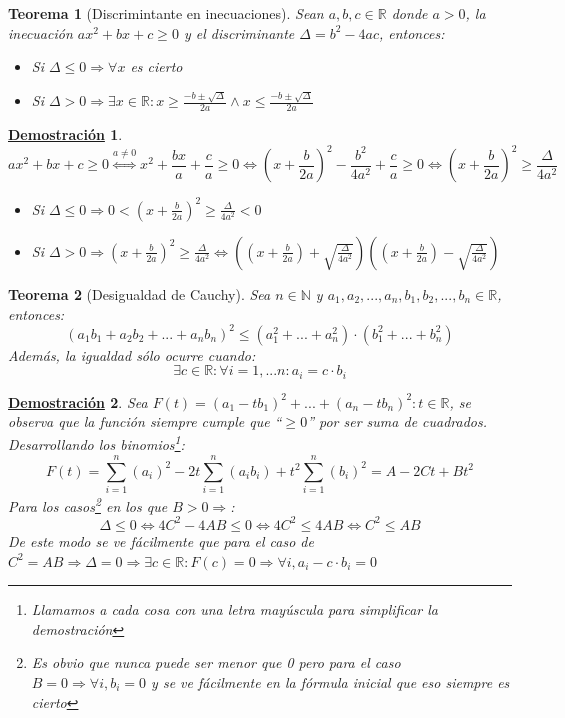 \documentclass[10pt,a4paper,openright]{book}
\theoremstyle{break}
\newtheorem{theo}{Teorema}[chapter]
\newtheorem*{demo}{\underline{Demostración}}
\begin{document}
\begin{theo}[Discrimintante en inecuaciones]
Sean $a,b,c\in \mathbb R$ donde $a>0$, la inecuación $ax^2+bx+c\geq 0$ y el discriminante $\Delta=b^2-4ac$, entonces:
\begin{itemize}
\item Si $\Delta\leq 0\Rightarrow \forall x$ es cierto
\item Si $\Delta>0 \Rightarrow \exists x \in \mathbb R : x\geq \frac{-b\pm\sqrt{\Delta}}{2a} \wedge x\leq \frac{-b\pm\sqrt{\Delta}}{2a}$
\end{itemize}
\end{theo}
\begin{demo}
$$ax^2+bx+c\geq 0\stackrel{a\neq 0}{\Leftrightarrow} x^2+\frac{bx}{a}+\frac{c}{a}\geq 0\Leftrightarrow (x+\frac{b}{2a})^2-\frac{b^2}{4a^2}+\frac{c}{a}\geq 0\Leftrightarrow (x+\frac{b}{2a})^2\geq \frac{\Delta}{4a^2}$$
\begin{itemize}
\item Si $\Delta\leq 0\Rightarrow 0<(x+\frac{b}{2a})^2 \geq \frac{\Delta}{4a^2}<0$
\item Si $\Delta>0\Rightarrow (x+\frac{b}{2a})^2 \geq \frac{\Delta}{4a^2}\Leftrightarrow \left((x+\frac{b}{2a})+\sqrt{\frac{\Delta}{4a^2}}\right)\left((x+\frac{b}{2a})-\sqrt{\frac{\Delta}{4a^2}}\right)$
\end{itemize}
\end{demo}

\begin{theo}[Desigualdad de Cauchy]
Sea $n\in \mathbb N$ y $a_1, a_2, ..., a_n, b_1, b_2, ..., b_n\in \mathbb R$, entonces:
$$(a_1b_1+a_2b_2+...+a_nb_n)^2 \leq (a_1^2+...+a_n^2)\cdot (b_1^2+...+b_n^2)$$
Además, la igualdad sólo ocurre cuando:
$$\exists c\in \mathbb R : \forall i=1,...n :a_i=c\cdot b_i$$
\end{theo}
\begin{demo}
Sea $F(t)=(a_1-tb_1)^2+...+(a_n-tb_n)^2 : t\in \mathbb R$, se observa que la función siempre cumple que ``$\geq 0$'' por ser suma de cuadrados. Desarrollando los binomios\footnote{Llamamos a cada cosa con una letra mayúscula para simplificar la demostración}:
$$F(t)=\sum_{i=1}^n (a_i)^2 -2t\sum_{i=1}^n (a_ib_i) + t^2\sum_{i=1}^n (b_i)^2=A-2Ct+Bt^2$$
Para los casos\footnote{Es obvio que nunca puede ser menor que 0 pero para el caso $B=0\Rightarrow \forall i, b_i=0$ y se ve fácilmente en la fórmula inicial que eso siempre es cierto} en los que $B>0\Rightarrow$:
$$\Delta\leq 0\Leftrightarrow 4C^2-4AB\leq 0\Leftrightarrow 4C^2\leq 4AB\Leftrightarrow C^2\leq AB$$
De este modo se ve fácilmente que para el caso de $C^2=AB\Rightarrow \Delta=0\Rightarrow \exists c\in \mathbb R : F(c)=0\Rightarrow \forall  i, a_i-c\cdot b_i=0$
\end{demo}
\end{document}
